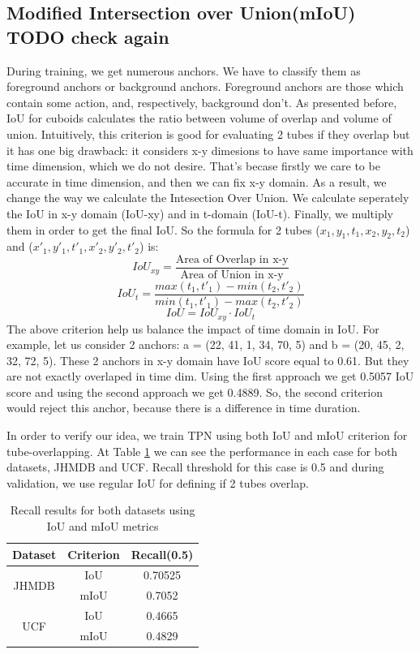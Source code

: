 \documentclass{report}
\begin{document}
\subsection{Modified Intersection over Union(mIoU) TODO check again} 
During training, we get numerous anchors. We have to classify them as foreground anchors or
background anchors. Foreground anchors are those which contain some action, and, respectively, background
don't. As presented before, IoU for cuboids calculates the ratio between volume of overlap and volume of
union.
Intuitively, this criterion is good for evaluating 2 tubes if they overlap but it has one big drawback:
it considers x-y dimesions to have same importance with time dimension, which we do not desire. That's becase
firstly we care to be accurate in time dimension, and then we can fix x-y domain.
As a result, we change the way we calculate the Intesection Over Union. We calculate seperately
the IoU in x-y domain (IoU-xy) and in t-domain (IoU-t). Finally, we multiply them in order to get the final IoU.
So the formula for 2 tubes ($x_1, y_1, t_1, x_2, y_2, t_2$) and ($x'_1, y'_1, t'_1, x'_2, y'_2, t'_2$) is:
\[ IoU_{xy} = \frac{ \text{Area of Overlap in x-y}} { \text{Area of Union in x-y}}  \]
\[ IoU_t = \frac { max(t_1, t'_1) - min(t_2, t'_2)} {min(t_1,t'_1) - max(t_2,t'_2)} \]
\[ IoU = IoU_{xy} \cdot  IoU_t \]
The above criterion help us balance the impact of time domain in IoU. For example, let us consider 2 anchors:
a = (22, 41, 1, 34, 70, 5) and b = (20, 45, 2, 32, 72, 5). These 2 anchors in x-y domain have IoU score equal to 0.61.
But they are not exactly overlaped in time dim. Using the first approach we get 0.5057 IoU score and using the
second approach we get 0.4889. So, the second criterion would reject this anchor, because there is a difference in time
duration.  \par

In order to verify our idea, we train TPN using both IoU and mIoU criterion for tube-overlapping. At Table \ref{table:iou_miou}
we can see the performance in each case for both datasets, JHMDB and UCF. Recall threshold for this case is 0.5 and during validation,
we use regular IoU for defining if 2 tubes overlap.
\begin{table}[h]
\centering
  \begin{tabular}{|| c | c || c ||}
    \hline
    \textbf{Dataset} & \textbf{Criterion} & \textbf{Recall(0.5)} \\
    \hline  \hline
    \multirow{2}{4em}{JHMDB} & IoU & 0.70525 \\
    \cline{2-3}
    {} & mIoU & 0.7052 \\
    \hline
    \multirow{2}{4em}{UCF} & IoU & 0.4665 \\
    \cline{2-3}
    {} & mIoU & 0.4829 \\
    \hline      
  \end{tabular}
  \caption{Recall results for both datasets using IoU and mIoU metrics}
  \label{table:iou_miou}
\end{table}
\end{document}

